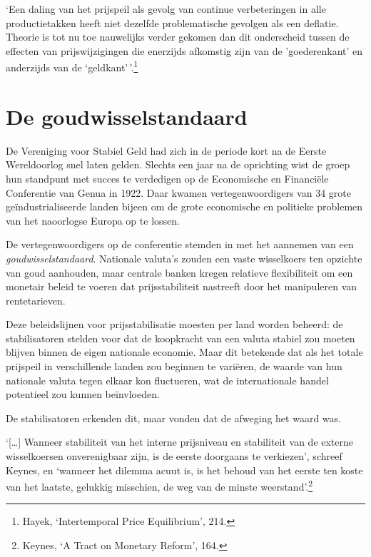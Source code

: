 \documentclass[smalldemyvopaper,11pt,twoside,onecolumn,openright,extrafontsizes,hidelinks]{memoir}
\begin{document}
`Een daling van het prijspeil als gevolg van continue verbeteringen in
alle productietakken heeft niet dezelfde problematische gevolgen als een
deflatie. Theorie is tot nu toe nauwelijks verder gekomen dan dit
onderscheid tussen de effecten van prijswijzigingen die enerzijds
afkomstig zijn van de 'goederenkant' en anderzijds van de
`geldkant'\,'.\footnote{\hspace{0pt}Hayek, `Intertemporal Price
  Equilibrium', 214.}

\section{De goudwisselstandaard}\label{de-goudwisselstandaard}

De Vereniging voor Stabiel Geld had zich in de periode kort na de Eerste
Wereldoorlog snel laten gelden. Slechts een jaar na de oprichting wist
de groep hun standpunt met succes te verdedigen op de Economische en
Financiële Conferentie van Genua in 1922. Daar kwamen vertegenwoordigers
van 34 grote geïndustrialiseerde landen bijeen om de grote economische
en politieke problemen van het naoorlogse Europa op te lossen.

De vertegenwoordigers op de conferentie stemden in met het aannemen van
een \emph{goudwisselstandaard}. Nationale valuta's zouden een vaste
wisselkoers ten opzichte van goud aanhouden, maar centrale banken kregen
relatieve flexibiliteit om een monetair beleid te voeren dat
prijsstabiliteit nastreeft door het manipuleren van rentetarieven.

Deze beleidslijnen voor prijsstabilisatie moesten per land worden
beheerd: de stabilisatoren stelden voor dat de koopkracht van een valuta
stabiel zou moeten blijven binnen de eigen nationale economie. Maar dit
betekende dat als het totale prijspeil in verschillende landen zou
beginnen te variëren, de waarde van hun nationale valuta tegen elkaar
kon fluctueren, wat de internationale handel potentieel zou kunnen
beïnvloeden.

De stabilisatoren erkenden dit, maar vonden dat de afweging het waard
was.

`{[}\ldots{]} Wanneer stabiliteit van het interne prijsniveau en
stabiliteit van de externe wisselkoersen onverenigbaar zijn, is de
eerste doorgaans te verkiezen', schreef Keynes, en `wanneer het dilemma
acuut is, is het behoud van het eerste ten koste van het laatste,
gelukkig misschien, de weg van de minste weerstand'.\footnote{\hspace{0pt}Keynes,
  `A Tract on Monetary Reform', 164.}
\end{document}
